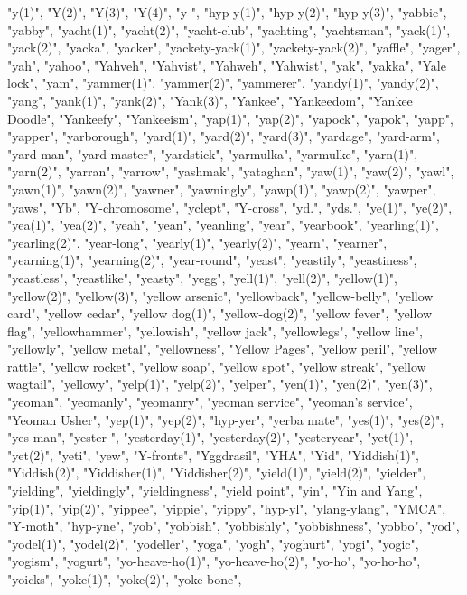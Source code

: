 "y(1)",
"Y(2)",
"Y(3)",
"Y(4)",
"y-",
"hyp-y(1)",
"hyp-y(2)",
"hyp-y(3)",
"yabbie",
"yabby",
"yacht(1)",
"yacht(2)",
"yacht-club",
"yachting",
"yachtsman",
"yack(1)",
"yack(2)",
"yacka",
"yacker",
"yackety-yack(1)",
"yackety-yack(2)",
"yaffle",
"yager",
"yah",
"yahoo",
"Yahveh",
"Yahvist",
"Yahweh",
"Yahwist",
"yak",
"yakka",
"Yale lock",
"yam",
"yammer(1)",
"yammer(2)",
"yammerer",
"yandy(1)",
"yandy(2)",
"yang",
"yank(1)",
"yank(2)",
"Yank(3)",
"Yankee",
"Yankeedom",
"Yankee Doodle",
"Yankeefy",
"Yankeeism",
"yap(1)",
"yap(2)",
"yapock",
"yapok",
"yapp",
"yapper",
"yarborough",
"yard(1)",
"yard(2)",
"yard(3)",
"yardage",
"yard-arm",
"yard-man",
"yard-master",
"yardstick",
"yarmulka",
"yarmulke",
"yarn(1)",
"yarn(2)",
"yarran",
"yarrow",
"yashmak",
"yataghan",
"yaw(1)",
"yaw(2)",
"yawl",
"yawn(1)",
"yawn(2)",
"yawner",
"yawningly",
"yawp(1)",
"yawp(2)",
"yawper",
"yaws",
"Yb",
"Y-chromosome",
"yclept",
"Y-cross",
"yd.",
"yds.",
"ye(1)",
"ye(2)",
"yea(1)",
"yea(2)",
"yeah",
"yean",
"yeanling",
"year",
"yearbook",
"yearling(1)",
"yearling(2)",
"year-long",
"yearly(1)",
"yearly(2)",
"yearn",
"yearner",
"yearning(1)",
"yearning(2)",
"year-round",
"yeast",
"yeastily",
"yeastiness",
"yeastless",
"yeastlike",
"yeasty",
"yegg",
"yell(1)",
"yell(2)",
"yellow(1)",
"yellow(2)",
"yellow(3)",
"yellow arsenic",
"yellowback",
"yellow-belly",
"yellow card",
"yellow cedar",
"yellow dog(1)",
"yellow-dog(2)",
"yellow fever",
"yellow flag",
"yellowhammer",
"yellowish",
"yellow jack",
"yellowlegs",
"yellow line",
"yellowly",
"yellow metal",
"yellowness",
"Yellow Pages",
"yellow peril",
"yellow rattle",
"yellow rocket",
"yellow soap",
"yellow spot",
"yellow streak",
"yellow wagtail",
"yellowy",
"yelp(1)",
"yelp(2)",
"yelper",
"yen(1)",
"yen(2)",
"yen(3)",
"yeoman",
"yeomanly",
"yeomanry",
"yeoman service",
"yeoman's service",
"Yeoman Usher",
"yep(1)",
"yep(2)",
"hyp-yer",
"yerba mate",
"yes(1)",
"yes(2)",
"yes-man",
"yester-",
"yesterday(1)",
"yesterday(2)",
"yesteryear",
"yet(1)",
"yet(2)",
"yeti",
"yew",
"Y-fronts",
"Yggdrasil",
"YHA",
"Yid",
"Yiddish(1)",
"Yiddish(2)",
"Yiddisher(1)",
"Yiddisher(2)",
"yield(1)",
"yield(2)",
"yielder",
"yielding",
"yieldingly",
"yieldingness",
"yield point",
"yin",
"Yin and Yang",
"yip(1)",
"yip(2)",
"yippee",
"yippie",
"yippy",
"hyp-yl",
"ylang-ylang",
"YMCA",
"Y-moth",
"hyp-yne",
"yob",
"yobbish",
"yobbishly",
"yobbishness",
"yobbo",
"yod",
"yodel(1)",
"yodel(2)",
"yodeller",
"yoga",
"yogh",
"yoghurt",
"yogi",
"yogic",
"yogism",
"yogurt",
"yo-heave-ho(1)",
"yo-heave-ho(2)",
"yo-ho",
"yo-ho-ho",
"yoicks",
"yoke(1)",
"yoke(2)",
"yoke-bone",
